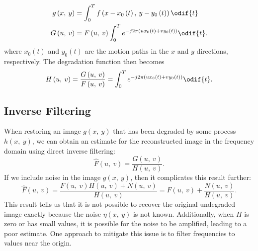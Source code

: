 \documentclass{article}
\begin{document}
\begin{itemize}
          \begin{align*}
              g\left( x,\: y \right) & = \int_0^T f\left( x - x_0\left( t \right),\: y - y_0\left( t \right) \right) \odif{t}                           \\
              G\left( u,\: v \right) & = F\left( u,\: v \right) \int_0^T e^{-j2\pi\left( ux_0\left( t \right) + vy_0\left( t \right) \right)} \odif{t}.
          \end{align*}
          where \(x_0\left( t \right)\) and \(y_0\left( t \right)\) are the
          motion paths in the \(x\) and \(y\) directions, respectively.
          The degradation function then becomes
          \begin{equation*}
              H\left( u,\: v \right) = \frac{G\left( u,\: v \right)}{F\left( u,\: v \right)} = \int_0^T e^{-j2\pi\left( ux_0\left( t \right) + vy_0\left( t \right) \right)} \odif{t}.
          \end{equation*}
\end{itemize}
\subsection{Inverse Filtering}
When restoring an image \(g\left( x,\: y \right)\) that has been
degraded by some process \(h\left( x,\: y \right)\), we can obtain an
estimate for the reconstructed image in the frequency domain using
direct inverse filtering:
\begin{equation*}
    \hat{F}\left( u,\: v \right) = \frac{G\left( u,\: v \right)}{H\left( u,\: v \right)}.
\end{equation*}
If we include noise in the image \(g\left( x,\: y \right)\), then it
complicates this result further:
\begin{equation*}
    \hat{F}\left( u,\: v \right) = \frac{F\left( u,\: v \right) H\left( u,\: v \right) + N\left( u,\: v \right)}{H\left( u,\: v \right)} = F\left( u,\: v \right) + \frac{N\left( u,\: v \right)}{H\left( u,\: v \right)}.
\end{equation*}
This result tells us that it is not possible to recover the original
undegraded image exactly because the noise \(\eta\left( x,\: y \right)\)
is not known. Additionally, when \(H\) is zero or has small values, it
is possible for the noise to be amplified, leading to a poor estimate.
One approach to mitigate this issue is to filter frequencies to values
near the origin.
\end{document}
